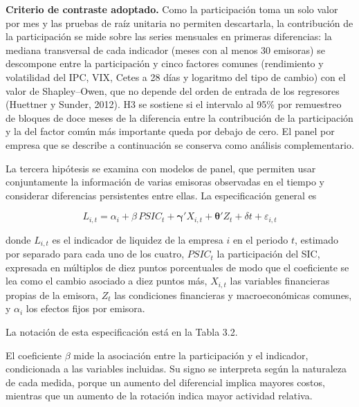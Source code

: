 
\textbf{Criterio de contraste adoptado.} Como la participación toma un solo valor por mes y las pruebas de raíz unitaria no permiten descartarla, la contribución de la participación se mide sobre las series mensuales en primeras diferencias: la mediana transversal de cada indicador (meses con al menos 30 emisoras) se descompone entre la participación y cinco factores comunes (rendimiento y volatilidad del IPC, VIX, Cetes a 28 días y logaritmo del tipo de cambio) con el valor de Shapley--Owen, que no depende del orden de entrada de los regresores (Huettner y Sunder, 2012). H3 se sostiene si el intervalo al 95\% por remuestreo de bloques de doce meses de la diferencia entre la contribución de la participación y la del factor común más importante queda por debajo de cero. El panel por empresa que se describe a continuación se conserva como análisis complementario.

La tercera hipótesis se examina con modelos de panel, que permiten usar conjuntamente la información de varias emisoras observadas en el tiempo y considerar diferencias persistentes entre ellas. La especificación general es

\begin{equation}L_{i,t} = \alpha_{i} + \beta\, PSIC_{t} + \mathbf{\gamma}'X_{i,t} + \mathbf{\theta}'Z_{t} + \delta t + \varepsilon_{i,t}\tag{10}\end{equation}

donde $L_{i,t}$ es el indicador de liquidez de la empresa $i$ en el periodo $t$, estimado por separado para cada uno de los cuatro, $PSIC_{t}$ la participación del SIC, expresada en múltiplos de diez puntos porcentuales de modo que el coeficiente se lea como el cambio asociado a diez puntos más, $X_{i,t}$ las variables financieras propias de la emisora, $Z_{t}$ las condiciones financieras y macroeconómicas comunes, y $\alpha_{i}$ los efectos fijos por emisora.

La notación de esta especificación está en la Tabla 3.2.

El coeficiente $\beta$ mide la asociación entre la participación y el indicador, condicionada a las variables incluidas. Su signo se interpreta según la naturaleza de cada medida, porque un aumento del diferencial implica mayores costos, mientras que un aumento de la rotación indica mayor actividad relativa.

